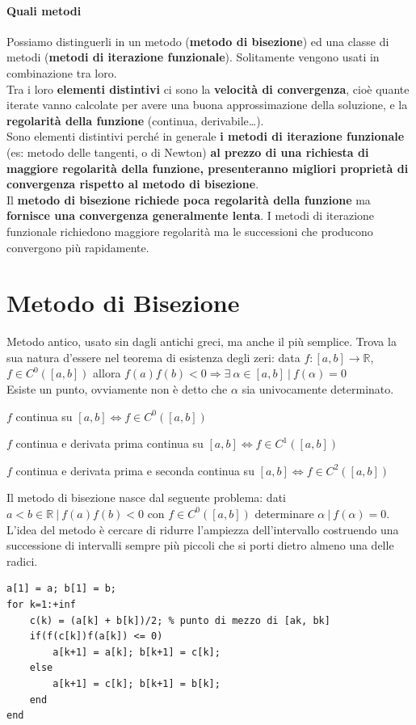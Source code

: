 \documentclass[10pt]{book}
\begin{document}
\paragraph{Quali metodi} Possiamo distinguerli in un metodo (\textbf{metodo di bisezione}) ed una classe di metodi (\textbf{metodi di iterazione funzionale}). Solitamente vengono usati in combinazione tra loro.\\
Tra i loro \textbf{elementi distintivi} ci sono la \textbf{velocità di convergenza}, cioè quante iterate vanno calcolate per avere una buona approssimazione della soluzione, e la \textbf{regolarità della funzione} (continua, derivabile\ldots).\\
Sono elementi distintivi perché in generale \textbf{i metodi di iterazione funzionale} (es: metodo delle tangenti, o di Newton) \textbf{al prezzo di una richiesta di maggiore regolarità della funzione, presenteranno migliori proprietà di convergenza rispetto al metodo di bisezione}.\\
Il \textbf{metodo di bisezione richiede poca regolarità della funzione} ma \textbf{fornisce una convergenza generalmente lenta}. I metodi di iterazione funzionale richiedono maggiore regolarità ma le successioni che producono convergono più rapidamente.
\section{Metodo di Bisezione}
Metodo antico, usato sin dagli antichi greci, ma anche il più semplice. Trova la sua natura d'essere nel teorema di esistenza degli zeri: data $f: [a, b] \rightarrow \mathbb{R}$, $f\in C^0([a, b])$ allora $f(a)f(b)<0 \Rightarrow \exists\:\alpha\in [a, b]\:|\:f(\alpha) = 0$\\
Esiste un punto, ovviamente non è detto che $\alpha$ sia univocamente determinato.
\begin{list}{}{Notazione}
	\item $f$ continua su $[a, b] \Leftrightarrow f\in C^0([a,b])$
	\item $f$ continua e derivata prima continua su $[a, b] \Leftrightarrow f\in C^1([a,b])$
	\item $f$ continua e derivata prima e seconda continua su $[a, b] \Leftrightarrow f\in C^2([a,b])$
\end{list}
Il metodo di bisezione nasce dal seguente problema: dati $a < b \in \mathbb{R}\:|\:f(a)f(b) < 0$ con $f\in C^0([a,b])$ determinare $\alpha\:|\:f(\alpha)=0$. L'idea del metodo è cercare di ridurre l'ampiezza dell'intervallo costruendo una successione di intervalli sempre più piccoli che si porti dietro almeno una delle radici.
\begin{lstlisting}
a[1] = a; b[1] = b;
for k=1:+inf
	c(k) = (a[k] + b[k])/2; % punto di mezzo di [ak, bk]
	if(f(c[k])f(a[k]) <= 0)
		a[k+1] = a[k]; b[k+1] = c[k];
	else
		a[k+1] = c[k]; b[k+1] = b[k];
	end
end
\end{lstlisting}
\end{document}
